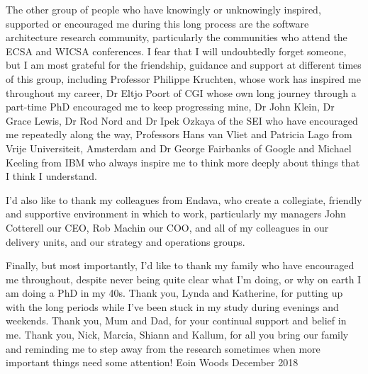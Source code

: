 \documentclass[a4paper, twoside, 11pt, hidelinks]{Thesis}  %
\begin{document}
{{The other group of people who have knowingly or unknowingly inspired, supported or encouraged me during this long process are the software architecture research community, particularly the communities who attend the ECSA and WICSA conferences.  I fear that I will undoubtedly forget someone, but I am most grateful for the friendship, guidance and support at different times of this group, including Professor Philippe Kruchten, whose work has inspired me throughout my career, Dr Eltjo Poort of CGI whose own long journey through a part-time PhD encouraged me to keep progressing mine, Dr John Klein, Dr Grace Lewis, Dr Rod Nord and Dr Ipek Ozkaya of the SEI who have encouraged me repeatedly along the way, Professors Hans van Vliet and Patricia Lago from Vrije Universiteit, Amsterdam and Dr George Fairbanks of Google and Michael Keeling from IBM who always inspire me to think more deeply about things that I think I understand.

I'd also like to thank my colleagues from Endava, who create a collegiate, friendly and supportive environment in which to work, particularly my managers John Cotterell our CEO, Rob Machin our COO, and all of my colleagues in our delivery units, and our strategy and operations groups.

Finally, but most importantly, I'd like to thank my family who have encouraged me throughout, despite never being quite clear what I'm doing, or why on earth I am doing a PhD in my 40s.  Thank you, Lynda and Katherine, for putting up with the long periods while I've been stuck in my study during evenings and weekends.  Thank you, Mum and Dad, for your continual support and belief in me.  Thank you, Nick, Marcia, Shiann and Kallum, for all you bring our family and reminding me to step away from the research sometimes when more important things need some attention!
\newline
\newline
\newline
Eoin Woods \newline
December 2018

}
\clearpage  %

\cleardoublepage
\pagestyle{empty}  %

}
\end{document}
